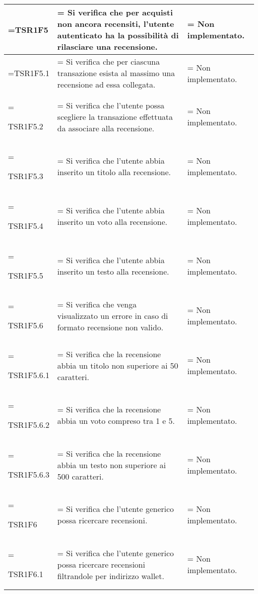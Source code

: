 \begin{xltabular}{\textwidth} {
            >{\hsize\linewidth=\hsize}X
            >{\hsize\linewidth=\hsize}X
            >{\hsize\linewidth=\hsize}X
        }
        TSR1F5&
        Si verifica che per acquisti non ancora recensiti, l'utente autenticato ha la possibilità di rilasciare una recensione.&
        Non implementato.
        \\ \hline

        TSR1F5.1&
        Si verifica che per ciascuna transazione esista al massimo una recensione ad essa collegata.&
        Non implementato.
        \\ \hline
        
        TSR1F5.2&
        Si verifica che l'utente possa scegliere la transazione effettuata da associare alla recensione.&
        Non implementato.
        \\ \hline

        TSR1F5.3&
        Si verifica che l'utente abbia inserito un titolo alla recensione.&
        Non implementato.
        \\ \hline

        TSR1F5.4&
        Si verifica che l'utente abbia inserito un voto alla recensione.&
        Non implementato.
        \\ \hline

        TSR1F5.5&
        Si verifica che l'utente abbia inserito un testo alla recensione.&
        Non implementato.
        \\ \hline

        TSR1F5.6&
        Si verifica che venga visualizzato un errore in caso di formato recensione non valido.&
        Non implementato.
        \\ \hline
        
        TSR1F5.6.1&
        Si verifica che la recensione abbia un titolo non superiore ai 50 caratteri.&
        Non implementato.
        \\ \hline

        TSR1F5.6.2&
        Si verifica che la recensione abbia un voto compreso tra 1 e 5.&
        Non implementato.
        \\ \hline

        TSR1F5.6.3&
        Si verifica che la recensione abbia un testo non superiore ai 500 caratteri.&
        Non implementato.
        \\ \hline

        TSR1F6&
        Si verifica che l'utente generico possa ricercare recensioni.&
        Non implementato.
        \\ \hline

        TSR1F6.1&
        Si verifica che l'utente generico possa ricercare recensioni filtrandole per indirizzo wallet.&
        Non implementato.
        \\ \hline
        

\end{xltabular}

